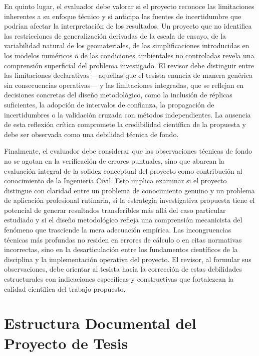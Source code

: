 En quinto lugar, el evaluador debe valorar si el proyecto reconoce las limitaciones inherentes a su enfoque técnico y si anticipa las fuentes de incertidumbre que podrían afectar la interpretación de los resultados. Un proyecto que no identifica las restricciones de generalización derivadas de la escala de ensayo, de la variabilidad natural de los geomateriales, de las simplificaciones introducidas en los modelos numéricos o de las condiciones ambientales no controladas revela una comprensión superficial del problema investigado. El revisor debe distinguir entre las limitaciones declarativas —aquellas que el tesista enuncia de manera genérica sin consecuencias operativas— y las limitaciones integradas, que se reflejan en decisiones concretas del diseño metodológico, como la inclusión de réplicas suficientes, la adopción de intervalos de confianza, la propagación de incertidumbres o la validación cruzada con métodos independientes. La ausencia de esta reflexión crítica compromete la credibilidad científica de la propuesta y debe ser observada como una debilidad técnica de fondo.

Finalmente, el evaluador debe considerar que las observaciones técnicas de fondo no se agotan en la verificación de errores puntuales, sino que abarcan la evaluación integral de la solidez conceptual del proyecto como contribución al conocimiento de la Ingeniería Civil. Esto implica examinar si el proyecto distingue con claridad entre un problema de conocimiento genuino y un problema de aplicación profesional rutinaria, si la estrategia investigativa propuesta tiene el potencial de generar resultados transferibles más allá del caso particular estudiado y si el diseño metodológico refleja una comprensión mecanicista del fenómeno que trasciende la mera adecuación empírica. Las incongruencias técnicas más profundas no residen en errores de cálculo o en citas normativas incorrectas, sino en la desarticulación entre los fundamentos científicos de la disciplina y la implementación operativa del proyecto. El revisor, al formular sus observaciones, debe orientar al tesista hacia la corrección de estas debilidades estructurales con indicaciones específicas y constructivas que fortalezcan la calidad científica del trabajo propuesto.

\newpage
\section{Estructura Documental del Proyecto de Tesis}

